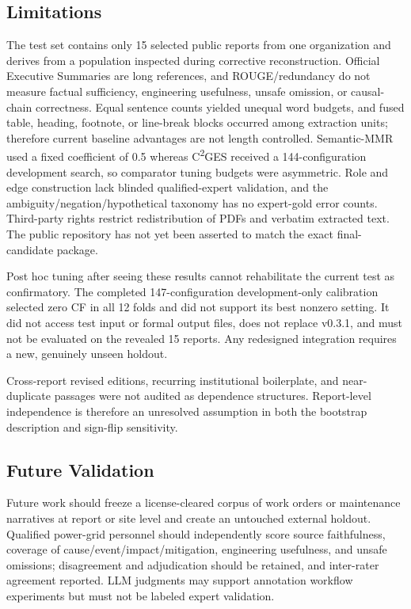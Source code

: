 \documentclass[applsci,article,submit,moreauthors]{Definitions/mdpi}
\newcommand{\cges}{C\textsuperscript{2}GES}
\begin{document}
\subsection{Limitations}

The test set contains only 15 selected public reports from one organization and derives from a population inspected during corrective reconstruction. Official Executive Summaries are long references, and ROUGE/redundancy do not measure factual sufficiency, engineering usefulness, unsafe omission, or causal-chain correctness. Equal sentence counts yielded unequal word budgets, and fused table, heading, footnote, or line-break blocks occurred among extraction units; therefore current baseline advantages are not length controlled. Semantic-MMR used a fixed coefficient of 0.5 whereas \cges{} received a 144-configuration development search, so comparator tuning budgets were asymmetric. Role and edge construction lack blinded qualified-expert validation, and the ambiguity/negation/hypothetical taxonomy has no expert-gold error counts. Third-party rights restrict redistribution of PDFs and verbatim extracted text. The public repository has not yet been asserted to match the exact final-candidate package.

Post hoc tuning after seeing these results cannot rehabilitate the current test as confirmatory. The completed 147-configuration development-only calibration selected zero CF in all 12 folds and did not support its best nonzero setting. It did not access test input or formal output files, does not replace v0.3.1, and must not be evaluated on the revealed 15 reports. Any redesigned integration requires a new, genuinely unseen holdout.

Cross-report revised editions, recurring institutional boilerplate, and near-duplicate passages were not audited as dependence structures. Report-level independence is therefore an unresolved assumption in both the bootstrap description and sign-flip sensitivity.

\subsection{Future Validation}

Future work should freeze a license-cleared corpus of work orders or maintenance narratives at report or site level and create an untouched external holdout. Qualified power-grid personnel should independently score source faithfulness, coverage of cause/event/impact/mitigation, engineering usefulness, and unsafe omissions; disagreement and adjudication should be retained, and inter-rater agreement reported. LLM judgments may support annotation workflow experiments but must not be labeled expert validation.
\end{document}
